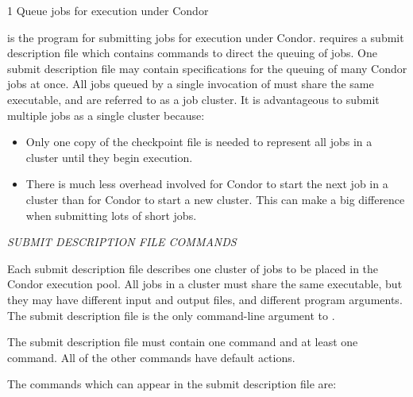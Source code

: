 \begin{ManPage}{\label{man-condor-submit}}{1}
{Queue jobs for execution under Condor}
\Synopsis {}
\oOpt{--}
\Lbr{}  \Opt{\Dots}\Rbr 
{}


\Description

 is the program for submitting jobs for execution
under Condor.
 requires a submit description file which contains commands
to direct the queuing of jobs. One submit description file may contain
specifications for the queuing of many Condor jobs at once.
All jobs queued by a
single invocation of  must share the same executable, and
are referred to as a job cluster. It is advantageous to submit
multiple jobs as a single cluster because:
\begin{itemize}
\item Only one copy of the checkpoint file is needed to 
represent all jobs in a cluster until they begin execution.
\item There is much less overhead involved for Condor to start the next
job in a cluster than for Condor to start a new cluster.  This can make
a big difference when submitting lots of short jobs.
\end{itemize}

\emph{SUBMIT DESCRIPTION FILE COMMANDS}

Each submit description file describes one cluster of jobs to be
placed in the Condor execution pool. All jobs in a cluster must share
the same executable, but they may have different input and output files,
and different program arguments. The submit description file is
the only command-line argument to . 

The submit description file must contain one  command and at least one
 command.  All of the other commands have default actions.

The commands which can appear in the submit description file are:

\begin{description} 



\end{description}
\end{ManPage}
